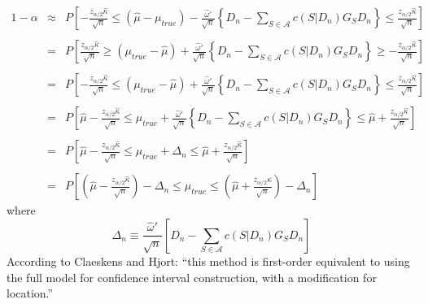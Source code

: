 \documentclass[12pt]{article}
\theoremstyle{definition}
\begin{document}
	\begin{eqnarray*}
		1-\alpha&\approx&P \left[-\frac{z_{\alpha/2}\widehat{\kappa}}{\sqrt{n}} \leq (\hat{\mu} - \mu_{true})  - \frac{\widehat{\omega}'}{\sqrt{n}}\left\{D_n -  \sum_{S\in \mathcal{A}} c(S|D_n)G_S D_n \right\} \leq\frac{z_{\alpha/2}\widehat{\kappa}}{\sqrt{n}} \right]\\\\
	&=&P \left[\frac{z_{\alpha/2}\widehat{\kappa}}{\sqrt{n}} \geq (\mu_{true} - \hat{\mu})  + \frac{\widehat{\omega}'}{\sqrt{n}}\left\{D_n -  \sum_{S\in \mathcal{A}} c(S|D_n)G_S D_n \right\} \geq -\frac{z_{\alpha/2}\widehat{\kappa}}{\sqrt{n}} \right]\\ \\
	&=&P \left[-\frac{z_{\alpha/2}\widehat{\kappa}}{\sqrt{n}} \leq (\mu_{true} - \hat{\mu})  + \frac{\widehat{\omega}'}{\sqrt{n}}\left\{D_n -  \sum_{S\in \mathcal{A}} c(S|D_n)G_S D_n \right\} \leq \frac{z_{\alpha/2}\widehat{\kappa}}{\sqrt{n}} \right]\\\\
	&=&P \left[\hat{\mu}-\frac{z_{\alpha/2}\widehat{\kappa}}{\sqrt{n}} \leq \mu_{true}  + \frac{\widehat{\omega}'}{\sqrt{n}}\left\{D_n -  \sum_{S\in \mathcal{A}} c(S|D_n)G_S D_n \right\} \leq \hat{\mu} + \frac{z_{\alpha/2}\widehat{\kappa}}{\sqrt{n}} \right]\\\\
	&=&P \left[\hat{\mu}-\frac{z_{\alpha/2}\widehat{\kappa}}{\sqrt{n}} \leq \mu_{true}  + \Delta_n\leq \hat{\mu} + \frac{z_{\alpha/2}\widehat{\kappa}}{\sqrt{n}} \right]\\\\
	&=&P \left[\left(\hat{\mu}-\frac{z_{\alpha/2}\widehat{\kappa}}{\sqrt{n}}\right) - \Delta_n \leq \mu_{true}  \leq \left(\hat{\mu} + \frac{z_{\alpha/2}\widehat{\kappa}}{\sqrt{n}}\right) - \Delta_n \right]
\end{eqnarray*}
where
	$$\Delta_n \equiv \frac{\widehat{\omega}'}{\sqrt{n}}\left[D_n -  \sum_{S\in \mathcal{A}} c(S|D_n)G_S D_n \right]$$
According to Claeskens and Hjort: ``this method is first-order equivalent to using the full model for confidence interval construction, with a modification for location.''
\end{document}
